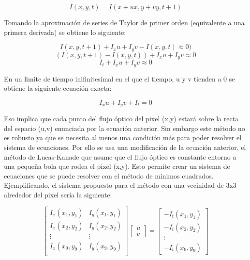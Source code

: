 \documentclass[a4paper,12pt]{article}
\begin{document}
{\vspace{0.5cm}

\begin{equation}
    I(x, y, t) = I(x + u x, y + v y, t + 1)
\end{equation}

\vspace{0.5cm}

Tomando la aproximación de series de Taylor de primer orden (equivalente a una primera derivada) se obtiene lo siguiente:

\vspace{0.5cm}

\[    
I(x, y, t + 1) + I_x u + I_y v - I(x,y,t) \approx 0) \]
\[
(I(x, y, t + 1) - I(x,y,t)) + I_x u + I_y v \approx 0 \]
\[
I_t + I_x u + I_y v \approx 0
\]

\vspace{0.5cm}

En un limite de tiempo inifinitesimal en el que el tiempo, u y v tienden a 0 se obtiene la siguiente ecuación exacta:

\vspace{0.5cm}

\begin{equation}
    I_x u + I_y v + I_t = 0
\end{equation}

Eso implica que cada punto del flujo óptico del pixel (x,y) estará sobre la recta del espacio (u,v) enunciada por la ecuación anterior. Sin embargo este método no es robusto 
ya que se necesita al menos una condición más para poder resolver el sistema de ecuaciones. Por ello se usa una modificación de la ecuación anterior, el método de Lucas-Kanade
que asume que el flujo óptico es constante entorno a una pequeña bola que rodea el pixel (x,y). Esto permite crear un sistema de ecuaciones que se puede resolver con el método de
mínimos cuadrados. Ejemplificando, el sistema propuesto para el método con una vecinidad de 3x3 alrededor del pixel sería la siguiente:

\vspace{0.5cm}

\[
    \begin{bmatrix}
        I_x(x_1, y_1) & I_y(x_1, y_1) \\
        I_x(x_2, y_2) & I_y(x_2, y_2) \\
        \vdots & \vdots \\
        I_x(x_9, y_9) & I_y(x_9, y_9) \\
    \end{bmatrix}
    \begin{bmatrix}
        u \\
        v
    \end{bmatrix}
    = 
    \begin{bmatrix}
        -I_t(x_1, y_1) \\
        -I_t(x_2, y_2) \\
        \vdots \\
        -I_t(x_9, y_9)
    \end{bmatrix}
\]

}
\end{document}
